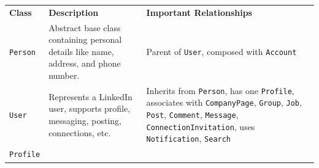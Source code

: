 \begin{center}
{\def\LTcaptype{none} %
\begin{longtable}[]{@{}
>{\centering\arraybackslash} p{}
>{\centering\arraybackslash} p{}
>{\centering\arraybackslash} p{}@{}}
\toprule\noalign{}
\endhead
\bottomrule\noalign{}
\endlastfoot
\begin{minipage}[t]{\linewidth}\centering
\textbf{Class}
\end{minipage} & \begin{minipage}[t]{\linewidth}\centering
\textbf{Description}
\end{minipage} & \begin{minipage}[t]{\linewidth}\centering
\textbf{Important Relationships}
\end{minipage} \\
\begin{minipage}[t]{\linewidth}\centering
\texttt{Person}
\end{minipage} & \begin{minipage}[t]{\linewidth}\centering
Abstract base class containing personal details like name, address, and phone number.
\end{minipage} & \begin{minipage}[t]{\linewidth}\centering
Parent of \texttt{User}, composed with \texttt{Account}
\end{minipage} \\
\begin{minipage}[t]{\linewidth}\centering
\texttt{User}
\end{minipage} & \begin{minipage}[t]{\linewidth}\centering
Represents a LinkedIn user, supports profile, messaging, posting, connections, etc.
\end{minipage} & \begin{minipage}[t]{\linewidth}\centering
Inherits from \texttt{Person}, has one \texttt{Profile}, associates with \texttt{CompanyPage}, \texttt{Group}, \texttt{Job}, \texttt{Post}, \texttt{Comment}, \texttt{Message}, \texttt{ConnectionInvitation}, uses \texttt{Notification}, \texttt{Search}
\end{minipage} \\
\begin{minipage}[t]{\linewidth}\centering
\texttt{Profile}
\end{minipage} & \begin{minipage}[t]{\linewidth}\centering

\end{minipage}
\end{longtable}}
\end{center}
